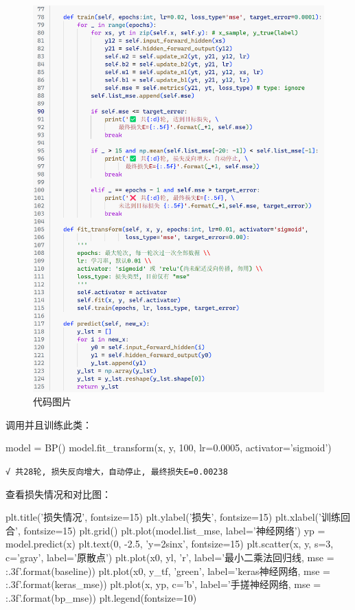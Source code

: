 \documentclass[a5paper, 11pt]{ctexbook}
\begin{document}
\begin{figure}[h!]
    \centering
    \includegraphics[width=\textwidth, frame]{figures/BP3.png}
    \caption{代码图片}\label{代码图片}
\end{figure}

\newpage

调用并且训练此类：

\begin{python}[h]
    model = BP()
    model.fit_transform(x, y, 100, lr=0.0005, activator='sigmoid')
\end{python}

\verb|√ 共28轮, 损失反向增大，自动停止, 最终损失E=0.00238|

查看损失情况和对比图：
\begin{python}
    plt.title('损失情况', fontsize=15)
    plt.ylabel('损失', fontsize=15)
    plt.xlabel('训练回合', fontsize=15)
    plt.grid()
    plt.plot(model.list_mse, label='神经网络')
    yp = model.predict(x)
    plt.text(0, -2.5, 'y=2sinx', fontsize=15)
    plt.scatter(x, y, s=3, c='gray', label='原散点')
    plt.plot(x0, yl, 'r', label='最小二乘法回归线, mse = {:.3f}'.format(baseline))
    plt.plot(x0, y_tf, 'green', label='keras神经网络, mse = {:.3f}'.format(keras_mse))
    plt.plot(x, yp, c='b', label='手搓神经网络, mse = {:.3f}'.format(bp_mse))
    plt.legend(fontsize=10)
\end{python}
\end{document}
